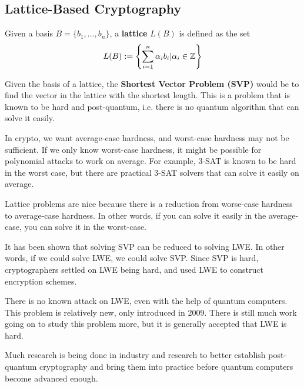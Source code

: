 \subsection{Lattice-Based Cryptography}

\begin{definition}
    Given a basis $B = \{ b_1, \dots, b_n\}$, a \textbf{lattice} $L(B)$ is defined as the set
    \[ L(B) := \left\{ \sum_{i=1}^n \alpha_i b_i | \alpha_i \in \mathbb Z \right\}\]

    \begin{center}
        \def\svgwidth{0.5\columnwidth}
        
    \end{center}
\end{definition}

Given the basis of a lattice, the \textbf{Shortest Vector Problem (SVP)} would be to find the vector in the lattice with the shortest length. This is a problem that is known to be hard and post-quantum, i.e. there is no quantum algorithm that can solve it easily.

In crypto, we want average-case hardness, and worst-case hardness may not be sufficient. If we only know worst-case hardness, it might be possible for polynomial attacks to work on average. For example, 3-SAT is known to be hard in the worst case, but there are practical 3-SAT solvers that can solve it easily on average.

Lattice problems are nice because there is a reduction from worse-case hardness to average-case hardness. In other words, if you can solve it easily in the average-case, you can solve it in the worst-case.

It has been shown that solving SVP can be reduced to solving LWE. In other words, if we could solve LWE, we could solve SVP. Since SVP is hard, cryptographers settled on LWE being hard, and used LWE to construct encryption schemes.

\begin{remark}
    There is no known attack on LWE, even with the help of quantum computers. This problem is relatively new, only introduced in 2009. There is still much work going on to study this problem more, but it is generally accepted that LWE is hard.

    Much research is being done in industry and research to better establish post-quantum cryptography and bring them into practice before quantum computers become advanced enough.
\end{remark}

